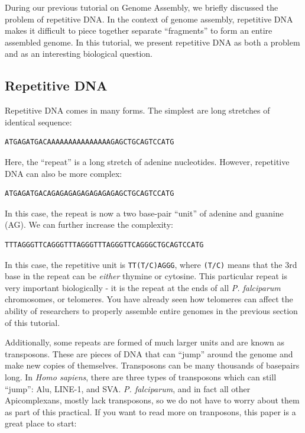 \documentclass[11pt]{article}
\begin{document}
During our previous tutorial on Genome Assembly, we briefly discussed
the problem of repetitive DNA. In the context of genome assembly,
repetitive DNA makes it difficult to piece together separate
``fragments'' to form an entire assembled genome. In this tutorial, we
present repetitive DNA as both a problem and as an interesting
biological question.

    \hypertarget{repetitive-dna}{%
\subsection{Repetitive DNA}\label{repetitive-dna}}

Repetitive DNA comes in many forms. The simplest are long stretches of
identical sequence:

\begin{verbatim}
ATGAGATGACAAAAAAAAAAAAAAAGAGCTGCAGTCCATG
\end{verbatim}

Here, the ``repeat'' is a long stretch of adenine nucleotides. However,
repetitive DNA can also be more complex:

\begin{verbatim}
ATGAGATGACAGAGAGAGAGAGAGAGAGCTGCAGTCCATG
\end{verbatim}

In this case, the repeat is now a two base-pair ``unit'' of adenine and
guanine (AG). We can further increase the complexity:

\begin{verbatim}
TTTAGGGTTCAGGGTTTAGGGTTTAGGGTTCAGGGCTGCAGTCCATG
\end{verbatim}

In this case, the repetitive unit is \texttt{TT(T/C)AGGG}, where
\texttt{(T/C)} means that the 3rd base in the repeat can be
\textit{either} thymine or cytosine. This particular repeat is very
important biologically - it is the repeat at the ends of all \textit{P.
falciparum} chromosomes, or telomeres. You have already seen how
telomeres can affect the ability of researchers to properly assemble
entire genomes in the previous section of this tutorial.

Additionally, some repeats are formed of much larger units and are known
as transposons. These are pieces of DNA that can ``jump'' around the
genome and make new copies of themselves. Transposons can be many
thousands of basepairs long. In \textit{Homo sapiens}, there are three
types of transposons which can still ``jump'': Alu, LINE-1, and SVA.
\textit{P. falciparum}, and in fact all other Apicomplexans, mostly lack
transposons, so we do not have to worry about them as part of this
practical. If you want to read more on tranposons, this paper is a great
place to start:
\end{document}
